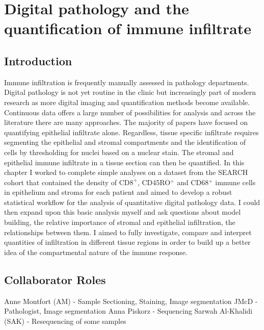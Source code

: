 
\chapter{Digital pathology and the quantification of immune infiltrate}

\ifpdf
    \graphicspath{{Chapter2/Figs/Raster/}{Chapter2/Figs/PDF/}{Chapter2/Figs/}}
\else
    \graphicspath{{Chapter2/Figs/Vector/}{Chapter2/Figs/}}
\fi

\section[Introduction]{Introduction}
Immune infiltration is frequently manually assessed in pathology departments. Digital pathology is not yet routine in the clinic but increasingly part of modern research as more digital imaging and quantification methods become available. 
Continuous data offers a large number of possibilities for analysis and across the literature there are many approaches. The majority of papers have focused on quantifying epithelial infiltrate alone. Regardless, tissue specific infiltrate requires segmenting the epithelial and stromal compartments and the identification of cells by thresholding for nuclei based on a nuclear stain. The stromal and epithelial immune infiltrate in a tissue section can then be quantified.  In this chapter I worked to complete simple analyses on a dataset from the SEARCH cohort that contained the density of CD$8^+$, CD45RO$^+$ and CD68$^+$ immune cells in epithelium and stroma for each patient and aimed to develop a robust statistical workflow for the analysis of quantitative digital pathology data. I could then expand upon this basic analysis myself and ask questions about model building, the relative importance of stromal and epithelial infiltration, the relationships between them. I aimed to fully investigate, compare and interpret quantities of infiltration in different tissue regions in order to build up a better idea of the compartmental nature of the immune response.

\section{Collaborator Roles}
Anne Montfort (AM) - Sample Sectioning, Staining, Image segmentation
JMcD - Pathologist, Image segmentation
Anna Piskorz - Sequencing
Sarwah Al-Khalidi (SAK) - Resequencing of some samples

